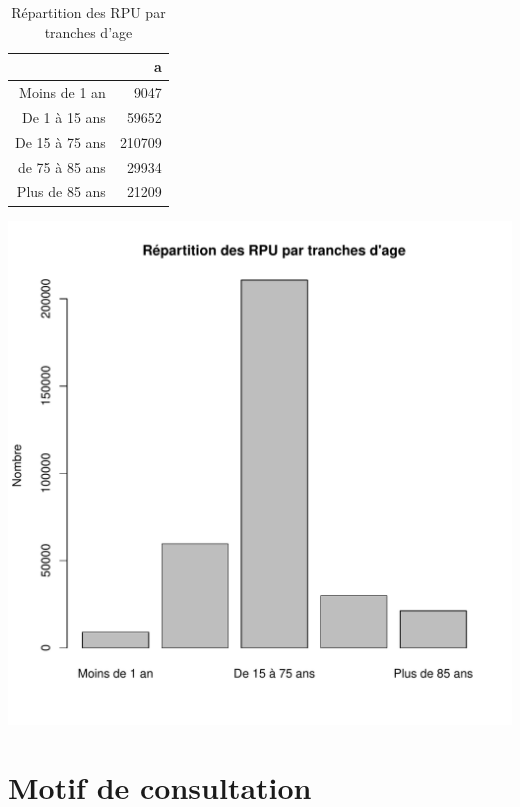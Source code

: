 \documentclass[12pt,english,french,twoside]{report}\usepackage[]{graphicx}\usepackage[]{color}
\makeatletter
\def\maxwidth{ %
  \ifdim\Gin@nat@width>\linewidth
    \linewidth
  \else
    \Gin@nat@width
  \fi
}
\makeatother
\begin{document}

\begin{table}[ht]
\centering
\begin{tabular}{rr}
  \hline
 & a \\ 
  \hline
Moins de 1 an & 9047 \\ 
  De 1 à 15 ans & 59652 \\ 
  De 15 à 75 ans & 210709 \\ 
  de 75 à 85 ans & 29934 \\ 
  Plus de 85 ans & 21209 \\ 
   \hline
\end{tabular}
\caption[Répartition des RPU par tranches d'age]{Répartition des RPU par tranches d'age} 
\label{tab:tranche}
\end{table}

\includegraphics[width=\maxwidth]{figure/tranche} 




\newpage
\chapter{Motif de consultation}


\end{document}
